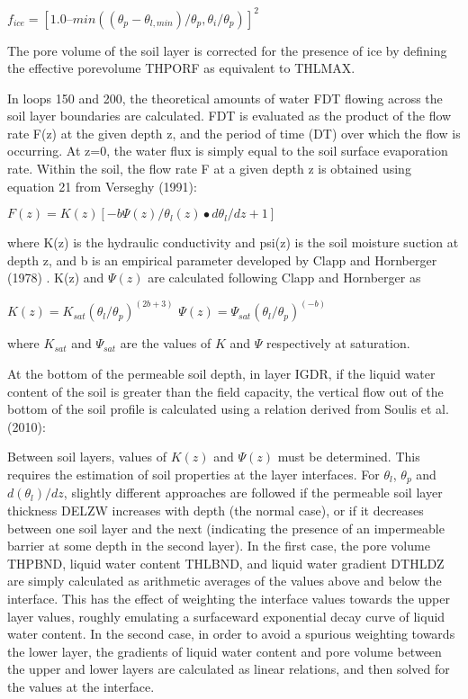 $f_{ice} = [1.0 – min((\theta_p - \theta_{l,min} )/\theta_p , \theta_i / \theta_p )]^2$

The pore volume of the soil layer is corrected for the presence of ice by defining the effective porevolume T\+H\+P\+O\+R\+F as equivalent to T\+H\+L\+M\+A\+X.

In loops 150 and 200, the theoretical amounts of water F\+D\+T flowing across the soil layer boundaries are calculated. F\+D\+T is evaluated as the product of the flow rate F(z) at the given depth z, and the period of time (D\+T) over which the flow is occurring. At z=0, the water flux is simply equal to the soil surface evaporation rate. Within the soil, the flow rate F at a given depth z is obtained using equation 21 from Verseghy (1991)\+:

$F(z) = K(z) [-b \Psi(z)/\theta_l(z) \bullet d\theta_l / dz + 1]$

where K(z) is the hydraulic conductivity and psi(z) is the soil moisture suction at depth z, and b is an empirical parameter developed by Clapp and Hornberger (1978) \cite{Clapp1978-898}. K(z) and $\Psi(z)$ are calculated following Clapp and Hornberger as

$K(z) = K_{sat} (\theta_l/\theta_p)^{(2b + 3)}$ $\Psi(z) = \Psi_{sat} (\theta_l/\theta_p)^{(-b )}$

where $K_{sat}$ and $\Psi_{sat}$ are the values of $K$ and $\Psi$ respectively at saturation.

At the bottom of the permeable soil depth, in layer I\+G\+D\+R, if the liquid water content of the soil is greater than the field capacity, the vertical flow out of the bottom of the soil profile is calculated using a relation derived from Soulis et al. (2010)\+:

Between soil layers, values of $K(z)$ and $\Psi(z)$ must be determined. This requires the estimation of soil properties at the layer interfaces. For $\theta_l$, $\theta_p$ and $d(\theta_l)/dz$, slightly different approaches are followed if the permeable soil layer thickness D\+E\+L\+Z\+W increases with depth (the normal case), or if it decreases between one soil layer and the next (indicating the presence of an impermeable barrier at some depth in the second layer). In the first case, the pore volume T\+H\+P\+B\+N\+D, liquid water content T\+H\+L\+B\+N\+D, and liquid water gradient D\+T\+H\+L\+D\+Z are simply calculated as arithmetic averages of the values above and below the interface. This has the effect of weighting the interface values towards the upper layer values, roughly emulating a surfaceward exponential decay curve of liquid water content. In the second case, in order to avoid a spurious weighting towards the lower layer, the gradients of liquid water content and pore volume between the upper and lower layers are calculated as linear relations, and then solved for the values at the interface.

